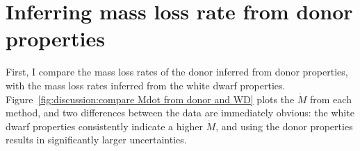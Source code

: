 

\section{Inferring mass loss rate from donor properties}
\label{sect:discussion:evolutionary modelling}

First, I compare the mass loss rates of the donor inferred from donor properties, with the mass loss rates inferred from the white dwarf properties. Figure~\ref{fig:discussion:compare Mdot from donor and WD} plots the $\dot M$ from each method, and two differences between the data are immediately obvious: the white dwarf properties consistently indicate a higher $\dot M$, and using the donor properties results in significantly larger uncertainties.

